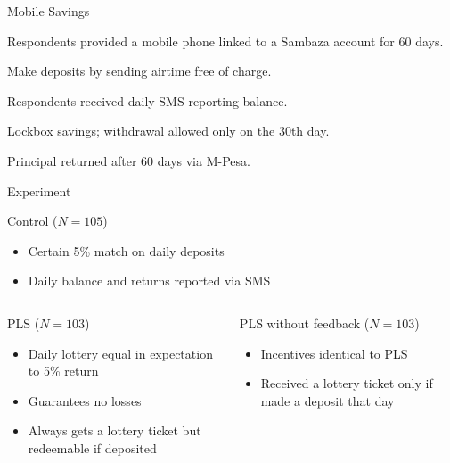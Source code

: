 \documentclass[aspectratio=169]{beamer}
\newenvironment{wideitemize}{\itemize\addtolength{\itemsep}{10pt}}{\enditemize}
\begin{document}
\begin{frame}{Mobile Savings}
	
	\begin{wideitemize}
		\item Respondents provided a mobile phone linked to a Sambaza account for 60 days.
		\item Make deposits by sending airtime free of charge.
		\item Respondents received daily SMS reporting balance.
		\item Lockbox savings; withdrawal allowed only on the 30th day.
		\item Principal returned after 60 days via M-Pesa.
	\end{wideitemize}


\end{frame}

\begin{frame}{Experiment}

	\begin{block}{Control ($N = 105$)}
		\begin{itemize}
		\item Certain 5\% match on daily deposits
		\item Daily balance and returns reported via SMS
		\end{itemize}
	\end{block}

	\begin{columns}[T]

		\begin{column}{0.48\textwidth}
			\begin{block}{PLS ($N = 103$)}
			\begin{itemize}
			\item Daily lottery equal in expectation to 5\% return
			\item Guarantees no losses
			\item Always gets a lottery ticket but redeemable if deposited
			\end{itemize}
			\end{block}
		\end{column}

		\begin{column}{0.48\textwidth}
			\begin{block}{PLS without feedback ($N = 103$)}
			\begin{itemize}
			\item Incentives identical to PLS
			\item Received a lottery ticket only if made a deposit that day
			\end{itemize}
			\end{block}
		\end{column}

	\end{columns}

\end{frame}
\end{document}
